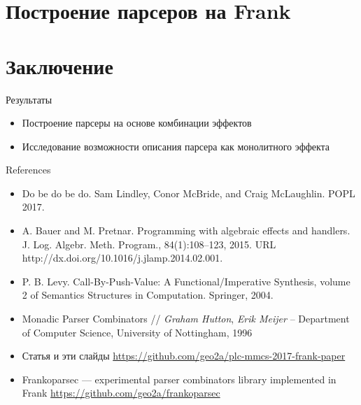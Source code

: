 \section{Построение парсеров на Frank}






\section{Заключение}
\begin{frame}{Результаты}
  \begin{itemize}
    \item Построение парсеры на основе комбинации эффектов
    \item Исследование возможности описания парсера как монолитного эффекта
  \end{itemize}
\end{frame}


\begin{frame}{References}

\begin{itemize}
  \item Do be do be do. Sam Lindley, Conor McBride, and Craig McLaughlin. POPL 2017.
  \item A. Bauer and M. Pretnar. Programming with algebraic effects and handlers. J. Log. Algebr. Meth. Program., 84(1):108–123, 2015. URL http://dx.doi.org/10.1016/j.jlamp.2014.02.001.
  \item P. B. Levy. Call-By-Push-Value: A Functional/Imperative Synthesis, volume 2 of Semantics Structures in Computation. Springer, 2004.
  \item Monadic Parser Combinators // \textit{Graham Hutton}, \textit{Erik Meijer} – Department of Computer Science, University of Nottingham, 1996
  \item Статья и эти слайды \url{https://github.com/geo2a/plc-mmcs-2017-frank-paper}
  \item Frankoparsec --- experimental parser combinators library implemented in Frank \url{https://github.com/geo2a/frankoparsec}
\end{itemize}

\end{frame}


